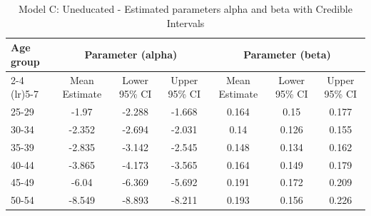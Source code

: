 \begin{landscape}
\begin{table}[htbp]
\centering
\caption{Model C: Uneducated - Estimated parameters alpha and beta  with Credible Intervals}
\label{tab:Fparameters_ab9}
\begin{tabular}{@{}lcccccc@{}}
\toprule
Age group & \multicolumn{3}{c}{Parameter (alpha)} & \multicolumn{3}{c}{Parameter (beta)} \\ 
\cmidrule(lr){2-4} \cmidrule(lr){5-7}
          & Mean Estimate & Lower 95\% CI & Upper 95\% CI & Mean Estimate & Lower 95\% CI & Upper 95\% CI \\ 
\midrule
25-29 & -1.97 & -2.288 & -1.668 & 0.164 & 0.15 & 0.177 \\
30-34 & -2.352 & -2.694 & -2.031 & 0.14 & 0.126 & 0.155 \\
35-39 & -2.835 & -3.142 & -2.545 & 0.148 & 0.134 & 0.162 \\
40-44 & -3.865 & -4.173 & -3.565 & 0.164 & 0.149 & 0.179 \\
45-49 & -6.04 & -6.369 & -5.692 & 0.191 & 0.172 & 0.209 \\
50-54 & -8.549 & -8.893 & -8.211 & 0.193 & 0.156 & 0.226 \\
\bottomrule
\end{tabular}
\end{table}
\end{landscape}